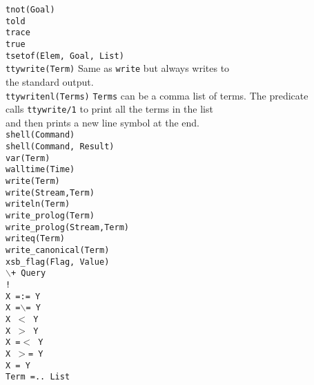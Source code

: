 \begin{tabbing}
 \> {\tt tnot(Goal)}		\>					\\
 \> {\tt told}			\>					\\
 \> {\tt trace}			\>					\\
 \> {\tt true}			\>					\\
 \> {\tt tsetof(Elem, Goal, List)} \>					\\
 \> {\tt ttywrite(Term)}	\> Same as {\tt write} but always writes to \\
 \>				\> the standard output.			\\
 \> {\tt ttywritenl(Terms)}	\>
		{\tt Terms} can be a comma list of terms. The predicate	\\
 \>	\>	calls {\tt ttywrite/1} to print all the terms in the list \\
 \>	\>	and then prints a new line symbol at the end.		\\
 \> {\tt shell(Command)}	\>					\\
 \> {\tt shell(Command, Result)}\>					\\
 \> {\tt var(Term)}		\>					\\
 \> {\tt walltime(Time)}	\>					\\
 \> {\tt write(Term)}		\>					\\
 \> {\tt write(Stream,Term)}	\>					\\
 \> {\tt writeln(Term)}		\>					\\
 \> {\tt write\_prolog(Term)}	\>					\\
 \> {\tt write\_prolog(Stream,Term)}	\>				\\
 \> {\tt writeq(Term)}		\>					\\
 \> {\tt write\_canonical(Term)} \>					\\
 \> {\tt xsb\_flag(Flag, Value)} \>					\\
 \> {\tt $\backslash$+ Query}	\>					\\
 \> {\tt !}			\>					\\
 \> {\tt X =:= Y}		\>					\\
 \> {\tt X =$\backslash$= Y}	\>					\\
 \> {\tt X $<$ Y}		\>					\\
 \> {\tt X $>$ Y}		\>					\\
 \> {\tt X =$<$ Y}		\>					\\
 \> {\tt X $>$= Y}		\>					\\
 \> {\tt X = Y}			\>					\\
 \> {\tt Term =.. List}		\>					\\

\end{tabbing}
